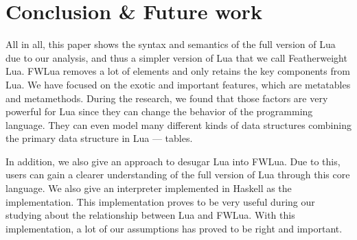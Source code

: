 \chapter{Conclusion \& Future work}
All in all, this paper shows the syntax and semantics of the full version of Lua due to our analysis, and thus a simpler version of Lua that we call Featherweight Lua. FWLua removes a lot of elements and only retains the key components from Lua. We have focused on the exotic and important features, which are metatables and metamethods. During the research, we found that those factors are very powerful for Lua since they can change the behavior of the programming language. They can even model many different kinds of data structures combining the primary data structure in Lua --- tables.

In addition, we also give an approach to desugar Lua into FWLua. Due to this, users can gain a clearer understanding of the full version of Lua through this core language. We also give an interpreter implemented in Haskell as the implementation. 
This implementation proves to be very useful during our studying about the relationship between Lua and FWLua. With this implementation,
a lot of our assumptions has proved to be right and important.

